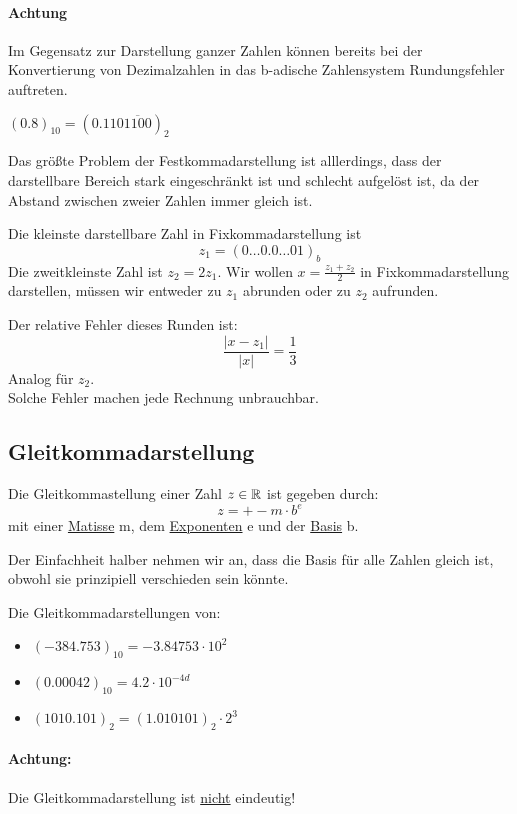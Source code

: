 \paragraph{Achtung} Im Gegensatz zur Darstellung ganzer Zahlen können bereits bei der Konvertierung von Dezimalzahlen in das b-adische Zahlensystem Rundungsfehler auftreten.
\begin{example}
	$(0.8)_{10}=(0.110\overline{1100})_2$
\end{example}
Das größte Problem der Festkommadarstellung ist alllerdings, dass der darstellbare Bereich stark eingeschränkt ist und schlecht aufgelöst ist, da der Abstand zwischen zweier Zahlen immer gleich ist.
\begin{example}
Die kleinste darstellbare Zahl in Fixkommadarstellung ist \[
z_1=(0 \ldots 0.0 \ldots 0 1)_b
\]
Die zweitkleinste Zahl ist $z_2=2z_1$. Wir wollen $x=\frac{z_1+z_2}{2}$ in Fixkommadarstellung darstellen, müssen wir entweder zu $z_1$ abrunden oder zu $z_2$ aufrunden.
\end{example}
\begin{fluff}
Der relative Fehler dieses Runden ist:
\[
\frac{|x-z_1|}{|x|}=\frac{1}{3}
\]
Analog für $z_2$. \\
Solche Fehler machen jede Rechnung unbrauchbar.
\end{fluff}
\subsection{Gleitkommadarstellung}
\begin{definition}[Gleitkommadarstellung]
	Die Gleitkommastellung einer Zahl $z \in  \mathbb{R}$ ist gegeben durch:
	\[
	z=+-m\cdot b^{e}
	\]
mit einer \underline{Matisse} m, dem \underline{Exponenten} e und der \underline{Basis} b.
\end{definition}
Der Einfachheit halber nehmen wir an, dass die Basis für alle Zahlen gleich ist, obwohl sie prinzipiell verschieden sein könnte.
\begin{example}
Die Gleitkommadarstellungen von:
\begin{itemize}
	\item $(-384.753)_{10}= -3.84753 \cdot 10^2$
	\item $(0.00042)_{10}=4.2 \cdot 10^{-4d}$
	\item $(1010.101)_2= (1.010101)_2 \cdot 2^{3}$
\end{itemize}
\end{example}
\paragraph{Achtung:} Die Gleitkommadarstellung ist \underline{nicht} eindeutig!


